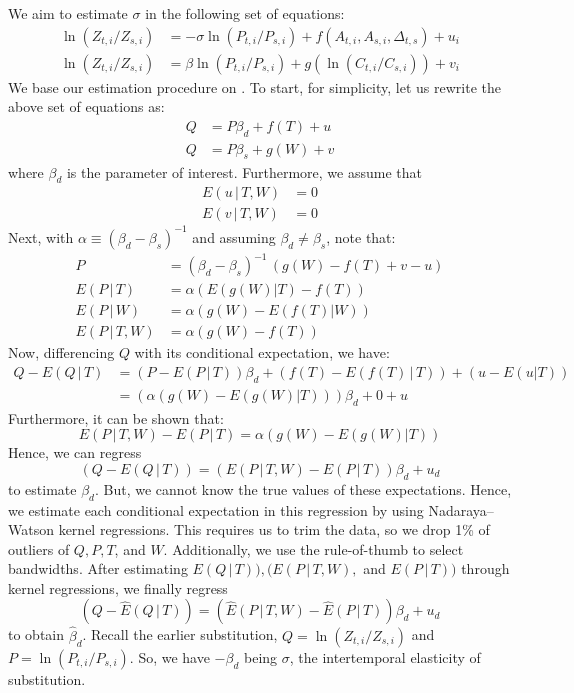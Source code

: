 \documentclass[11pt,a4paper,leqno]{extarticle}
\begin{document}
	We aim to estimate $\sigma$ in the following set of equations:
	\begin{align*}
	\ln (Z_{ t, i} / Z_{ s, i}) &= -\sigma \ln (P_{t,i} / P_{s,i}) +  f \left( A_{t,i}, A_{s,i}, \Delta_{t,s} \right) + u_i \\
	\ln (Z_{ t, i} / Z_{ s, i}) &= \beta \ln (P_{t,i} / P_{s,i}) + g \left( \ln (C_{t,i} / C_{s,i})  \right) + v_{i}
	\end{align*}
	We base our estimation procedure on \citet{Newey}. To start, for simplicity, let us rewrite the above set of equations as:
	\begin{align*}
	Q &= P \beta_d + f(T) + u \\
	Q &= P \beta_s + g(W) + v 
	\end{align*}
	where $\beta_d$ is the parameter of interest. Furthermore, we assume that 
	\begin{align*}
	E(u \, | \, T, W) &= 0 \\
	E(v \, | \, T, W) &= 0 
	\end{align*}
	Next, with $\alpha \equiv (\beta_d - \beta_s)^{-1}$ and assuming $\beta_d \neq \beta_s$, note that:
	\begin{align*}
	P &= (\beta_d - \beta_s)^{-1} \, \left(  g(W) - f(T) + v - u \right)  \\
	E(P\,|\,T)   &= \alpha \left( E(g(W)|T) - f(T)  \right)\\
	E(P\,|\,W)   &= \alpha \left( g(W) - E(f(T)|W)  \right) \\
	E(P\,|\,T,W) &= \alpha \left( g(W) - f(T)     \right) 
	\end{align*}
	Now, differencing $Q$ with its conditional expectation, we have:
	\begin{align*}
	Q - E(Q \,|\,T) &= (P - E(P\,|\,T))\beta_d + (f(T) - E(f(T) \,|\,T)) + (u - E(u|T))\\
	&= (\alpha(g(W) - E(g(W)|T)))\beta_d + 0 + u
	\end{align*}
	Furthermore, it can be shown that:
	$$E(P\,|\,T,W) - E(P\,|\,T) = \alpha (g(W) - E(g(W)|T))$$
	Hence, we can regress 
	$$(Q - E(Q \,|\,T)) = (E(P\,|\,T,W) - E(P\,|\,T)) \beta_d + u_d $$
	to estimate $\beta_d$. But, we cannot know the true values of these expectations. Hence, we estimate each conditional expectation in this regression by using Nadaraya–Watson kernel regressions. This requires us to trim the data, so we drop 1\% of outliers of $Q, P, T$, and $W$. Additionally, we use the \citet{Silverman} rule-of-thumb to select bandwidths. After estimating $E(Q \,|\,T)), (E(P\,|\,T,W),$ and $E(P\,|\,T))$ through kernel regressions, we finally regress
	$$(Q - \hat{E}(Q \,|\,T)) = (\hat{E}(P\,|\,T,W) - \hat{E}(P\,|\,T)) \beta_d + u_d $$
	to obtain $\hat{\beta}_d$. Recall the earlier substitution, $Q = \ln (Z_{ t, i} / Z_{ s, i})$ and $P = \ln (P_{t,i} / P_{s,i})$. So, we have  $-\beta_d$ being $\sigma$, the intertemporal elasticity of substitution.
	\pagebreak
	\pagebreak
	
\end{document}
